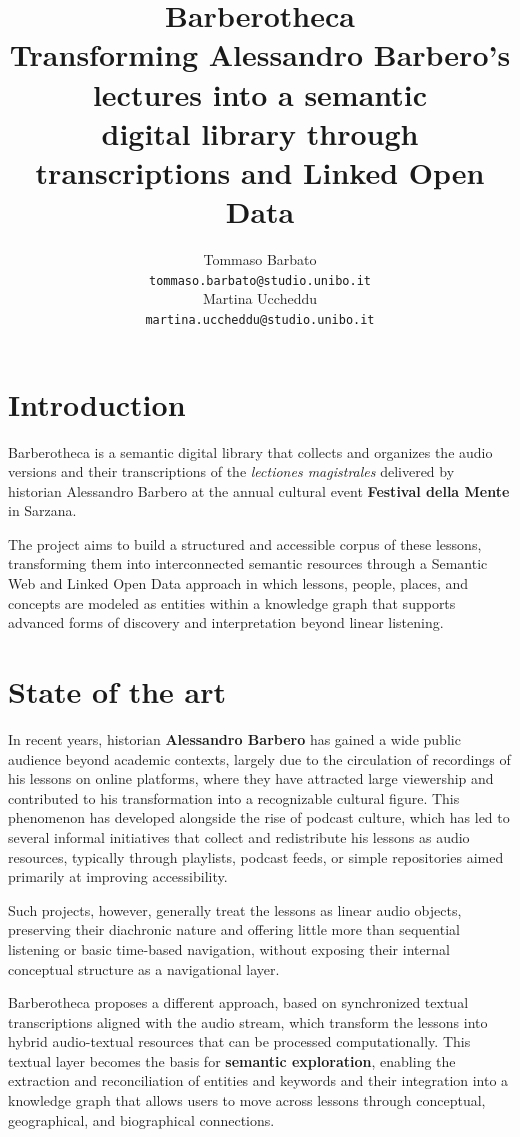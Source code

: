 \documentclass[11pt]{article}
\title{
  \LARGE Barberotheca \\[0.2em]
  \large Transforming Alessandro Barbero's lectures into a semantic \\
  	digital library through transcriptions and Linked Open Data
}
\author{
  Tommaso Barbato \\
    {\small\tt tommaso.barbato@studio.unibo.it} \\\And
  Martina Uccheddu \\
    {\small\tt martina.uccheddu@studio.unibo.it} \\
 }
\begin{document}
\maketitle

\section{Introduction}
Barberotheca is a semantic digital library that collects and organizes the audio versions and their transcriptions of the \textit{lectiones magistrales} delivered by historian Alessandro Barbero at the annual cultural event \textbf{Festival della Mente} in Sarzana.

The project aims to build a structured and accessible corpus of these lessons, transforming them into interconnected semantic resources through a Semantic Web and Linked Open Data approach in which lessons, people, places, and concepts are modeled as entities within a knowledge graph that supports advanced forms of discovery and interpretation beyond linear listening.


\section{State of the art}
In recent years, historian \textbf{Alessandro Barbero} has gained a wide public audience beyond academic contexts, largely due to the circulation of recordings of his lessons on online platforms, where they have attracted large viewership and contributed to his transformation into a recognizable cultural figure. This phenomenon has developed alongside the rise of podcast culture, which has led to several informal initiatives that collect and redistribute his lessons as audio resources, typically through playlists, podcast feeds, or simple repositories aimed primarily at improving accessibility.

Such projects, however, generally treat the lessons as linear audio objects, preserving their diachronic nature and offering little more than sequential listening or basic time-based navigation, without exposing their internal conceptual structure as a navigational layer.

Barberotheca proposes a different approach, based on synchronized textual transcriptions aligned with the audio stream, which transform the lessons into hybrid audio-textual resources that can be processed computationally. This textual layer becomes the basis for \textbf{semantic exploration}, enabling the extraction and reconciliation of entities and keywords and their integration into a knowledge graph that allows users to move across lessons through conceptual, geographical, and biographical connections.
\end{document}
